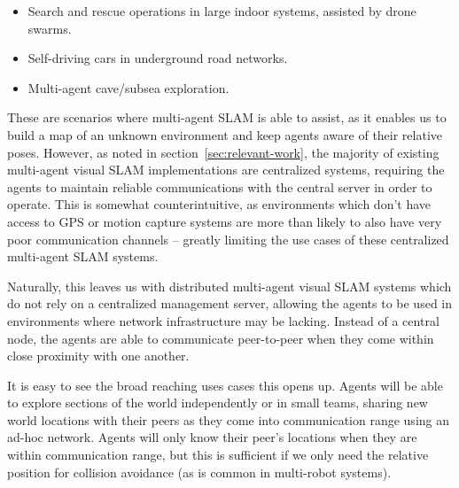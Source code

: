 {
    \begin{itemize}[nosep]
        \item Search and rescue operations in large indoor systems, assisted by drone swarms.
        \item Self-driving cars in underground road networks.
        \item Multi-agent cave/subsea exploration.
    \end{itemize}
}

These are scenarios where multi-agent SLAM is able to assist, as it enables us to build a map of an unknown environment and keep agents aware of their relative poses. However, as noted in section~\ref{sec:relevant-work}, the majority of existing multi-agent visual SLAM implementations are centralized systems, requiring the agents to maintain reliable communications with the central server in order to operate. This is somewhat counterintuitive, as environments which don't have access to GPS or motion capture systems are more than likely to also have very poor communication channels -- greatly limiting the use cases of these centralized multi-agent SLAM systems.

Naturally, this leaves us with distributed multi-agent visual SLAM systems which do not rely on a centralized management server, allowing the agents to be used in environments where network infrastructure may be lacking. Instead of a central node, the agents are able to communicate peer-to-peer when they come within close proximity with one another.

It is easy to see the broad reaching uses cases this opens up. Agents will be able to explore sections of the world independently or in small teams, sharing new world locations with their peers as they come into communication range using an ad-hoc network. Agents will only know their peer's locations when they are within communication range, but this is sufficient if we only need the relative position for collision avoidance (as is common in multi-robot systems).

